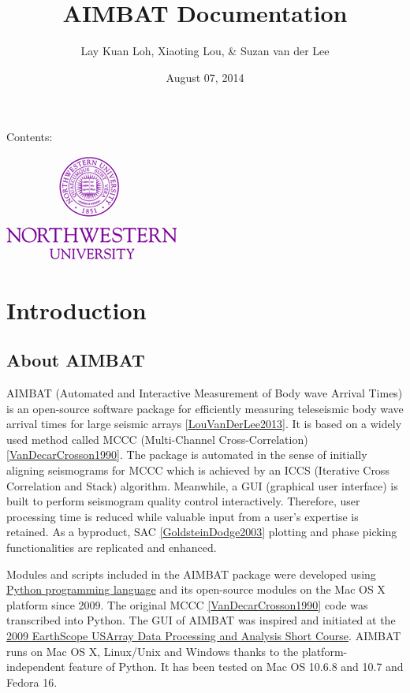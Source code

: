 \documentclass[letterpaper,10pt,english]{sphinxmanual}
\title{AIMBAT Documentation}
\date{August 07, 2014}
\author{Lay Kuan Loh, Xiaoting Lou, \& Suzan van der Lee}
\begin{document}
\maketitle
\tableofcontents
{}\label{index::doc}


Contents:

\includegraphics{NU_Logo_purple.jpg}


\chapter{Introduction}
\label{docfiles/introduction:introduction}\label{docfiles/introduction:welcome-to-aimbat-s-documentation}\label{docfiles/introduction::doc}

\section{About AIMBAT}
\label{docfiles/introduction:about-aimbat}
AIMBAT (Automated and Interactive Measurement of Body wave Arrival Times) is an open-source software package for efficiently measuring teleseismic body wave arrival times for large seismic arrays {\hyperref[docfiles/citations:louvanderlee2013]{{[}LouVanDerLee2013{]}}}. It is based on a widely used method called MCCC (Multi-Channel Cross-Correlation) {\hyperref[docfiles/citations:vandecarcrosson1990]{{[}VanDecarCrosson1990{]}}}. The package is automated in the sense of initially aligning seismograms for MCCC which is achieved by an ICCS (Iterative Cross Correlation and Stack) algorithm. Meanwhile, a GUI (graphical user interface) is built to perform seismogram quality control interactively. Therefore, user processing time is reduced while valuable input from a user's expertise is retained. As a byproduct, SAC {\hyperref[docfiles/citations:goldsteindodge2003]{{[}GoldsteinDodge2003{]}}} plotting and phase picking functionalities are replicated and enhanced.

Modules and scripts included in the AIMBAT package were developed using \href{http://www.python.org/}{Python programming language} and its open-source modules on the Mac OS X platform since 2009. The original MCCC {\hyperref[docfiles/citations:vandecarcrosson1990]{{[}VanDecarCrosson1990{]}}} code was transcribed into Python. The GUI of AIMBAT was inspired and initiated at the \href{http://www.iris.edu/hq/es\_course/content/2009.html}{2009 EarthScope USArray Data Processing and Analysis Short Course}. AIMBAT runs on Mac OS X, Linux/Unix and Windows thanks to the platform-independent feature of Python. It has been tested on Mac OS 10.6.8 and 10.7 and Fedora 16.
\end{document}
